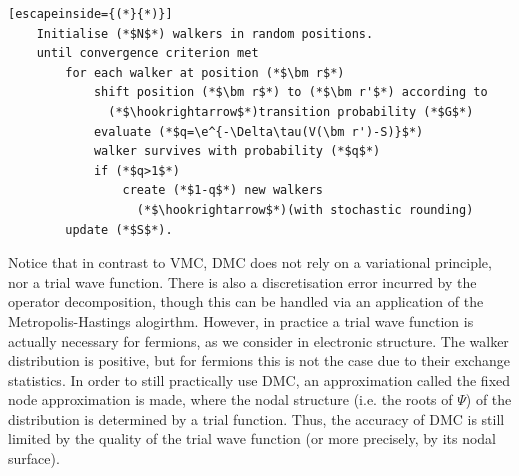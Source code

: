 \begin{minipage}{\textwidth}
\begin{lstlisting}[escapeinside={(*}{*)}]
    Initialise (*$N$*) walkers in random positions.
    until convergence criterion met
        for each walker at position (*$\bm r$*)
            shift position (*$\bm r$*) to (*$\bm r'$*) according to
              (*$\hookrightarrow$*)transition probability (*$G$*)
            evaluate (*$q=\e^{-\Delta\tau(V(\bm r')-S)}$*)
            walker survives with probability (*$q$*)
            if (*$q>1$*)
                create (*$1-q$*) new walkers
                  (*$\hookrightarrow$*)(with stochastic rounding)
        update (*$S$*).
\end{lstlisting}
\end{minipage}

Notice that in contrast to \gls{VMC}, \gls{DMC} does not rely on a variational principle, nor a trial wave function. There is also a discretisation error incurred by the operator decomposition, though this can be handled via an application of the Metropolis-Hastings alogirthm.\cite{thijssenComputational2007}
However, in practice a trial wave function is actually necessary for fermions, as we consider in electronic structure. The walker distribution is positive, but for fermions this is not the case due to their exchange statistics. In order to still practically use DMC, an approximation called the fixed node approximation is made, where the nodal structure (i.e. the roots of $\Psi$) of the distribution is determined by a trial function. Thus, the accuracy of DMC is still limited by the quality of the trial wave function (or more precisely, by its nodal surface).




